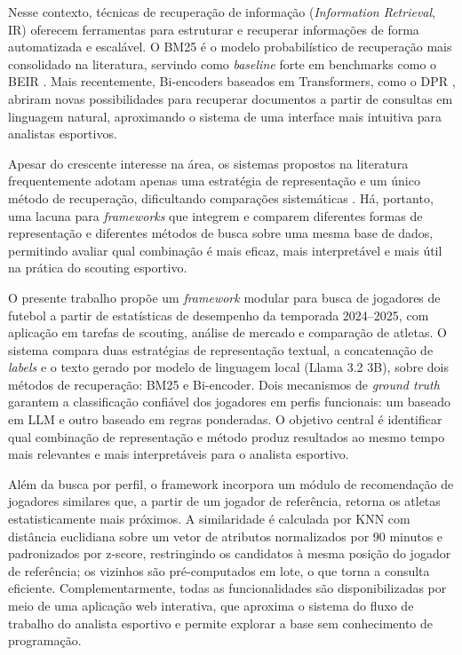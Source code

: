 \documentclass[portuguese]{sbc2025}
\begin{document}
Nesse contexto, técnicas de recuperação de informação (\textit{Information Retrieval},
IR) oferecem ferramentas para estruturar e recuperar informações de forma automatizada
e escalável. O BM25 \citep{robertson2009} é o modelo probabilístico de recuperação
mais consolidado na literatura, servindo como \textit{baseline} forte em benchmarks
como o BEIR \citep{thakur2021}. Mais recentemente, Bi-encoders baseados em
Transformers, como o DPR \citep{karpukhin2020}, abriram novas possibilidades para
recuperar documentos a partir de consultas em linguagem natural, aproximando o sistema
de uma interface mais intuitiva para analistas esportivos.

Apesar do crescente interesse na área, os sistemas propostos na literatura
frequentemente adotam apenas uma estratégia de representação e um único método de
recuperação, dificultando comparações sistemáticas \citep{springer2026,researchgate2025}.
Há, portanto, uma lacuna para \textit{frameworks} que integrem e comparem diferentes
formas de representação e diferentes métodos de busca sobre uma mesma base de dados,
permitindo avaliar qual combinação é mais eficaz, mais interpretável e mais útil na
prática do scouting esportivo.

O presente trabalho propõe um \textit{framework} modular para busca de jogadores de
futebol a partir de estatísticas de desempenho da temporada 2024--2025, com aplicação
em tarefas de scouting, análise de mercado e comparação de atletas. O sistema compara
duas estratégias de representação textual, a concatenação de \textit{labels} e o texto
gerado por modelo de linguagem local (Llama 3.2 3B), sobre dois métodos de
recuperação: BM25 e Bi-encoder. Dois mecanismos de \textit{ground truth} garantem
a classificação confiável dos jogadores em perfis funcionais: um baseado em LLM e
outro baseado em regras ponderadas. O objetivo central é identificar qual combinação
de representação e método produz resultados ao mesmo tempo mais relevantes e mais
interpretáveis para o analista esportivo.

Além da busca por perfil, o framework incorpora um módulo de recomendação de
jogadores similares que, a partir de um jogador de referência, retorna os
atletas estatisticamente mais próximos. A similaridade é calculada por KNN com
distância euclidiana sobre um vetor de atributos normalizados por 90 minutos e
padronizados por z-score, restringindo os candidatos à mesma posição do jogador
de referência; os vizinhos são pré-computados em lote, o que torna a consulta
eficiente. Complementarmente, todas as funcionalidades são disponibilizadas por
meio de uma aplicação web interativa, que aproxima o sistema do fluxo de
trabalho do analista esportivo e permite explorar a base sem conhecimento de
programação.
\end{document}
